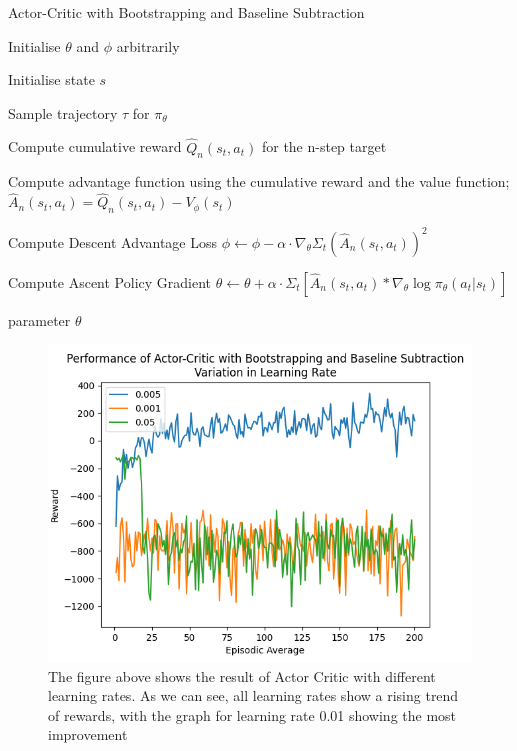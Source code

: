 \documentclass{article}
\begin{document}
\begin{algorithm}[htbp]
\caption{Actor-Critic with Bootstrapping and Baseline Subtraction}
\SetAlgoLined
\DontPrintSemicolon
\small %
Initialise $\theta$ and $\phi$ arbitrarily\;\\
{
    Initialise state $s$\;
     \item Sample trajectory $\tau$ for $\pi_\theta$
     \item
    {
     \item Compute cumulative reward $\hat{Q}_n(s_t,a_t)$  for the n-step target
     \item Compute advantage function using the cumulative reward and the value function;
     \(\hat{A}_n(s_t,a_t) = \hat{Q}_n(s_t,a_t) - V_\phi(s_t)\)
    }
    \item Compute Descent Advantage Loss
    \newline
     \(\phi \leftarrow \phi - \alpha \cdot \nabla_\theta\Sigma_t(\hat{A}_n(s_t,a_t))^2\) 
     \item Compute Ascent Policy Gradient
     \newline 
    \(\theta \leftarrow \theta + \alpha \cdot \Sigma_t[\hat{A}_n(s_t,a_t)*\nabla_\theta\log\pi_\theta(a_t|s_t)]\)
}
\State \Return parameter $\theta$
\end{algorithm}
\begin{figure}[htbp]
\centering
\includegraphics[width=0.9\linewidth]{Report/images/Performance_of_Actor_Critic_BSandBS_LR.png}
\caption{\label{fig:ActorCriticBS2-different learning rates}The figure above shows the result of Actor Critic with different learning rates. As we can see, all learning rates show a rising trend of rewards, with the graph for learning rate 0.01 showing the most improvement}
\end{figure}
\end{document}
